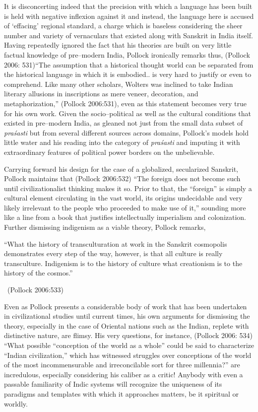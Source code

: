 It is disconcerting indeed that the precision with which a language has been built is held with negative inflexion against it and instead, the language here is accused of ‘effacing’ regional standard, a charge which is baseless considering the sheer number and variety of vernaculars that existed along with Sanskrit in India itself. Having repeatedly ignored the fact that his theories are built on very little factual knowledge of pre–modern India, Pollock ironically remarks thus, (Pollock 2006: 531)“The assumption that a historical thought world can be separated from the historical language in which it is embodied.. is very hard to justify or even to comprehend. Like many other scholars, Wolters was inclined to take Indian literary allusions in inscriptions as mere veneer, decoration, and metaphorization,” (Pollock 2006:531), even as this statement becomes very true for his own work. Given the socio–political as well as the cultural conditions that existed in pre–modern India, as gleaned not just from the small data subset of \textit{praśasti} but from several different sources across domains, Pollock’s models hold little water and his reading into the category of \textit{praśasti} and imputing it with extraordinary features of political power borders on the unbelievable.

Carrying forward his design for the case of a globalized, secularized Sanskrit, Pollock maintains that (Pollock 2006:532) “The foreign does not become such until civilizationalist thinking makes it so. Prior to that, the “foreign” is simply a cultural element circulating in the vast world, its origins undecidable and very likely irrelevant to the people who proceeded to make use of it,” sounding more like a line from a book that justifies intellectually imperialism and colonization. Further dismissing indigenism as a viable theory, Pollock remarks,

\begin{myquote}
“What the history of transculturation at work in the Sanskrit cosmopolis demonstrates every step of the way, however, is that all culture is really transculture. Indigenism is to the history of culture what creationism is to the history of the cosmos.” 

~\hfill (Pollock 2006:533)
\end{myquote}

Even as Pollock presents a considerable body of work that has been undertaken in civilizational studies until current times, his own arguments for dismissing the theory, especially in the case of Oriental nations such as the Indian, replete with distinctive nature, are flimsy. His very questions, for instance, (Pollock 2006: 534) “What possible “conception of the world as a whole” could be said to characterize “Indian civilization,” which has witnessed struggles over conceptions of the world of the most incommensurable and irreconcilable sort for three millennia?” are incredulous, especially considering his caliber as a critic! Anybody with even a passable familiarity of Indic systems will recognize the uniqueness of its paradigms and templates with which it approaches matters, be it spiritual or worldly.

